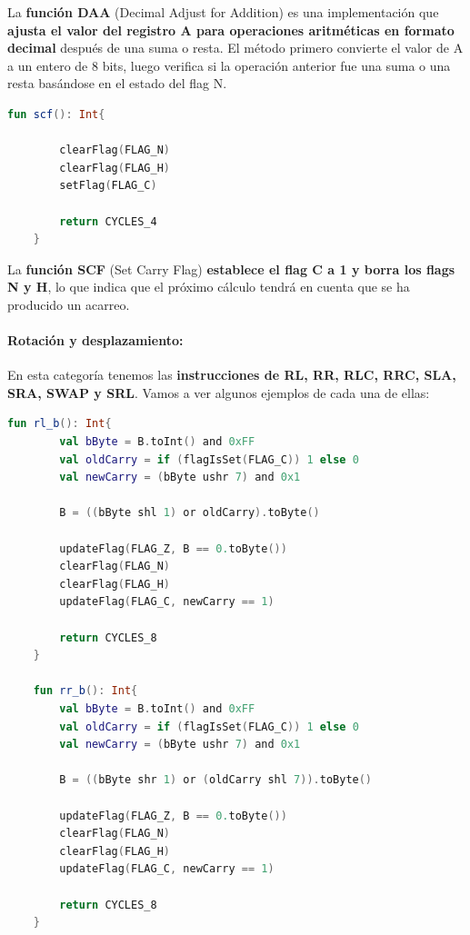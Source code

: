 La \textbf{función DAA} (Decimal Adjust for Addition) es una implementación que \textbf{ajusta el valor del registro A para operaciones aritméticas en formato decimal} después de una suma o resta. El método primero convierte el valor de A a un entero de 8 bits, luego verifica si la operación anterior fue una suma o una resta basándose en el estado del flag N.

\begin{lstlisting}[language=Kotlin, caption={Operación SCF}, label={code:kotlinscf}]
    fun scf(): Int{

        clearFlag(FLAG_N)
        clearFlag(FLAG_H)
        setFlag(FLAG_C)

        return CYCLES_4
    }
\end{lstlisting}

La \textbf{función SCF} (Set Carry Flag) \textbf{establece el flag C a 1 y borra los flags N y H}, lo que indica que el próximo cálculo tendrá en cuenta que se ha producido un acarreo.

\paragraph{Rotación y desplazamiento:} En esta categoría tenemos las \textbf{instrucciones de RL, RR, RLC, RRC, SLA, SRA, SWAP y SRL}. Vamos a ver algunos ejemplos de cada una de ellas:

\begin{lstlisting}[language=Kotlin, caption={Operaciones RL y RR}, label={code:kotlinrlrr}]
    fun rl_b(): Int{
        val bByte = B.toInt() and 0xFF
        val oldCarry = if (flagIsSet(FLAG_C)) 1 else 0
        val newCarry = (bByte ushr 7) and 0x1

        B = ((bByte shl 1) or oldCarry).toByte()

        updateFlag(FLAG_Z, B == 0.toByte())
        clearFlag(FLAG_N)
        clearFlag(FLAG_H)
        updateFlag(FLAG_C, newCarry == 1)

        return CYCLES_8
    }
    
    fun rr_b(): Int{
        val bByte = B.toInt() and 0xFF
        val oldCarry = if (flagIsSet(FLAG_C)) 1 else 0
        val newCarry = (bByte ushr 7) and 0x1

        B = ((bByte shr 1) or (oldCarry shl 7)).toByte()

        updateFlag(FLAG_Z, B == 0.toByte())
        clearFlag(FLAG_N)
        clearFlag(FLAG_H)
        updateFlag(FLAG_C, newCarry == 1)

        return CYCLES_8
    }
\end{lstlisting}

